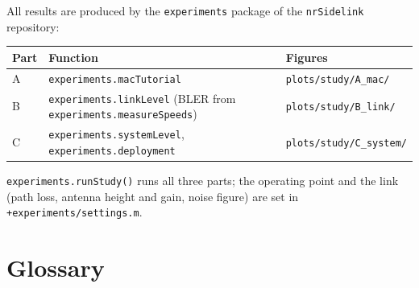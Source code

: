 \documentclass{article}
\newcommand{\code}[1]{\texttt{#1}}
\begin{document}
All results are produced by the \code{experiments} package of the
\code{nrSidelink} repository:
\begin{center}
\small
\begin{tabular}{l l l}
\toprule
\textbf{Part} & \textbf{Function} & \textbf{Figures} \\
\midrule
A & \code{experiments.macTutorial} & \code{plots/study/A\_mac/} \\
B & \code{experiments.linkLevel} (BLER from \code{experiments.measureSpeeds}) & \code{plots/study/B\_link/} \\
C & \code{experiments.systemLevel}, \code{experiments.deployment} & \code{plots/study/C\_system/} \\
\bottomrule
\end{tabular}
\end{center}
\code{experiments.runStudy()} runs all three parts; the operating point
and the link (path loss, antenna height and gain, noise figure) are set
in \code{+experiments/settings.m}.

\section*{Glossary}
\end{document}
